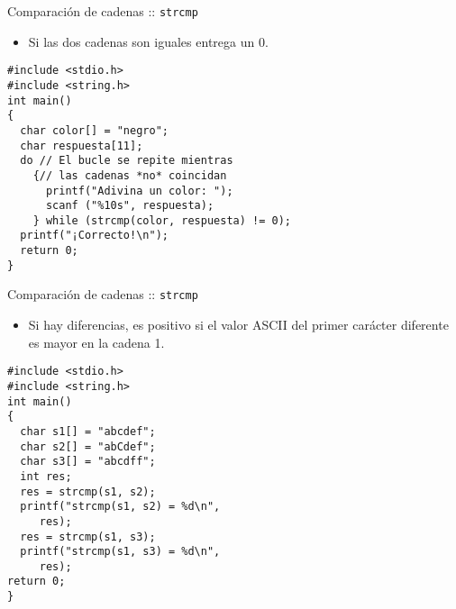 \documentclass[xcolor={usenames,svgnames,dvipsnames}, aspectratio=169]{beamer}
\begin{document}
\begin{frame}[label={sec:orga1f0d73},fragile]{Comparación de cadenas :: \texttt{strcmp}}
 \begin{itemize}
\item \alert{Si las dos cadenas son iguales entrega un 0}.
\end{itemize}

\lstset{language=C,label= ,caption= ,captionpos=b,numbers=none}
\begin{lstlisting}
#include <stdio.h>
#include <string.h>
int main()
{
  char color[] = "negro";
  char respuesta[11];
  do // El bucle se repite mientras
    {// las cadenas *no* coincidan
      printf("Adivina un color: ");
      scanf ("%10s", respuesta);
    } while (strcmp(color, respuesta) != 0);
  printf("¡Correcto!\n");
  return 0;
}
\end{lstlisting}
\end{frame}

\begin{frame}[label={sec:org75f7de7},fragile]{Comparación de cadenas :: \texttt{strcmp}}
 \begin{itemize}
\item Si hay diferencias, es positivo si el valor ASCII del primer carácter diferente es mayor en la cadena 1.
\end{itemize}

\lstset{language=C,label= ,caption= ,captionpos=b,numbers=none}
\begin{lstlisting}
#include <stdio.h>
#include <string.h>
int main()
{
  char s1[] = "abcdef";
  char s2[] = "abCdef";
  char s3[] = "abcdff";
  int res;
  res = strcmp(s1, s2);
  printf("strcmp(s1, s2) = %d\n",
	 res);
  res = strcmp(s1, s3);
  printf("strcmp(s1, s3) = %d\n",
	 res);
return 0;
}
\end{lstlisting}
\end{frame}
\end{document}

